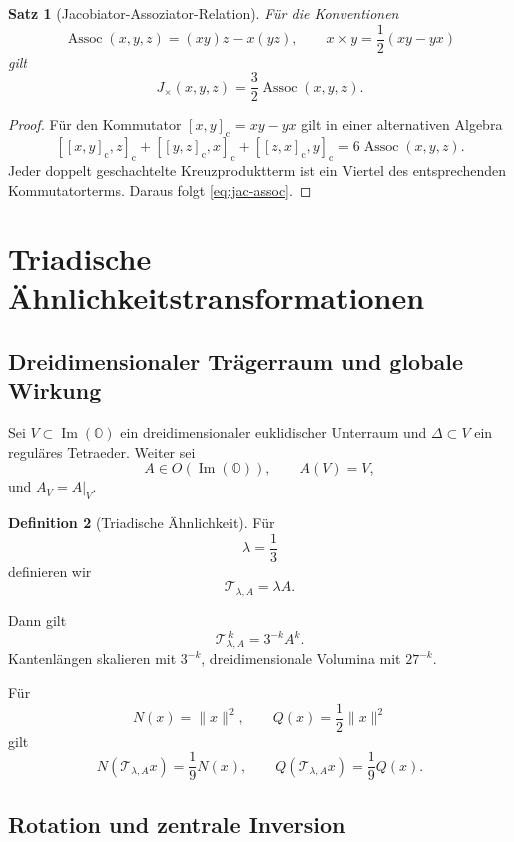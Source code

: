 \documentclass[11pt,a4paper]{article}
\newtheorem{theorem}{Satz}[section]
\theoremstyle{definition}
\newtheorem{definition}[theorem]{Definition}
\newcommand{\ImO}{\operatorname{Im}(\mathbb O)}
\newcommand{\Assoc}{\operatorname{Assoc}}
\begin{document}
\begin{theorem}[Jacobiator-Assoziator-Relation]
Für die Konventionen
\[
\Assoc(x,y,z)=(xy)z-x(yz),
\qquad
x\times y=\frac12(xy-yx)
\]
gilt
\begin{equation}
J_\times(x,y,z)
=
\frac32\Assoc(x,y,z).
\label{eq:jac-assoc}
\end{equation}
\end{theorem}

\begin{proof}
Für den Kommutator $[x,y]_{\mathrm c}=xy-yx$ gilt in einer alternativen Algebra
\[
[[x,y]_{\mathrm c},z]_{\mathrm c}
+
[[y,z]_{\mathrm c},x]_{\mathrm c}
+
[[z,x]_{\mathrm c},y]_{\mathrm c}
=
6\Assoc(x,y,z).
\]
Jeder doppelt geschachtelte Kreuzproduktterm ist ein Viertel des entsprechenden Kommutatorterms. Daraus folgt \cref{eq:jac-assoc}.
\end{proof}

\section{Triadische Ähnlichkeitstransformationen}

\subsection{Dreidimensionaler Trägerraum und globale Wirkung}

Sei $V\subset\ImO$ ein dreidimensionaler euklidischer Unterraum und $\Delta\subset V$ ein reguläres Tetraeder. Weiter sei
\[
A\in O(\ImO),
\qquad
A(V)=V,
\]
und $A_V=A|_V$.

\begin{definition}[Triadische Ähnlichkeit]
Für
\[
\lambda=\frac13
\]
definieren wir
\[
\mathcal T_{\lambda,A}
=
\lambda A.
\]
\end{definition}

Dann gilt
\[
\mathcal T_{\lambda,A}^{\,k}
=
3^{-k}A^k.
\]
Kantenlängen skalieren mit $3^{-k}$, dreidimensionale Volumina mit $27^{-k}$.

Für
\[
N(x)=\|x\|^2,
\qquad
Q(x)=\frac12\|x\|^2
\]
gilt
\begin{equation}
N(\mathcal T_{\lambda,A}x)
=
\frac19N(x),
\qquad
Q(\mathcal T_{\lambda,A}x)
=
\frac19Q(x).
\label{eq:quadratic-scale}
\end{equation}

\subsection{Rotation und zentrale Inversion}
\end{document}
